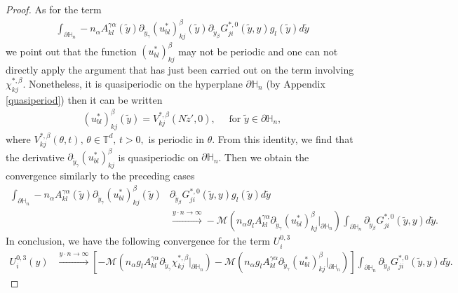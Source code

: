 \documentclass[11pt, reqno]{amsart}
\theoremstyle{definition}
\theoremstyle{remark}
\numberwithin{equation}{section}
\begin{document}
\begin{proof}[Proof]
		\noindent 	As for the term 
		\begin{align*}
			\int_{\partial\mathbb{H}_n}\!\!-n_\alpha A^{\gamma\alpha}_{kl}(\tilde{y})\partial_{ \tilde{y}_\gamma}  (u^*_{bl})^{\beta}_{kj}\left(\tilde{y} \right) \partial_{ \tilde{y}_\beta} G^{*,0}_{ji}\left(\tilde{y},y\right)  g_l(\tilde{y}) d\tilde{y}
		\end{align*}
		we point out that the function $(u^*_{bl})^{\beta}_{kj}$ may not be  periodic and one can not directly apply the argument that has just been carried out on the term involving $ \chi_{kj}^{*,\beta}$. Nonetheless, it is quasiperiodic on the hyperplane  $\partial\mathbb{H}_n$ (by Appendix \ref{quasiperiod}) then it can be written 
		\begin{align}
			(u^*_{bl})^{\beta}_{kj}(\tilde{y})=  V_{kj}^{*,\beta}( N\tilde{z}',0 ),\quad \mbox{ for }\tilde{y}\in\partial\mathbb{H}_n,	\label{id_quasiperiod_u}
		\end{align}
		where $V_{kj}^{*,\beta}(\theta,t),\, \theta\in \mathbb{T}^d, \, t>0,$ is periodic in $\theta$.
		From this identity, we find that the derivative $\partial_{ \tilde{y}_\gamma} (u^*_{bl})^{\beta}_{kj}$ is quasiperiodic on $\partial\mathbb{H}_n$.	Then we obtain the convergence similarly to the preceding cases
		\begin{align*}
			\int_{\partial\mathbb{H}_n} -n_\alpha A^{\gamma\alpha}_{kl}(\tilde{y})\partial_{ \tilde{y}_\gamma}  (u^*_{bl})^{\beta}_{kj}(\tilde{y})&\partial_{\tilde{y}_\beta} G^{*,0}_{ji}(\tilde{y},y) g_l(\tilde{y}) d\tilde{y} \\
			& \xrightarrow{y\cdot n\rightarrow \infty}-\mathcal{M}(n_\alpha g_l A^{\gamma\alpha}_{kl}\partial_{ \tilde{y}_\gamma}  (u^*_{bl})^{\beta}_{kj}|_{\partial\mathbb{H}_n})
			\int_{\partial\mathbb{H}_n} \!\partial_{ \tilde{y}_\beta}G^{*,0}_{ji}(\tilde{y},y) d\tilde{y} .
		\end{align*}
		In conclusion, we have the following convergence for the term $U_i^{0,3}$
		\begin{align}
			U_i^{0,3}(y)
			& \xrightarrow{y\cdot n\rightarrow \infty}\left[-\mathcal{M}(n_\alpha g_l A^{\gamma\alpha}_{kl}\partial_{ \tilde{y}_\gamma}  \chi_{kj}^{*,\beta}|_{\partial\mathbb{H}_n})-\mathcal{M}(n_\alpha g_l A^{\gamma\alpha}_{kl}\partial_{ \tilde{y}_\gamma}  (u^*_{bl})^{\beta}_{kj}|_{\partial\mathbb{H}_n}) \right]\!
			\int_{\partial\mathbb{H}_n}\!\! \partial_{\tilde{y}_\beta}G^{*,0}_{ji}(\tilde{y},y) d\tilde{y} \label{convbl3}.
		\end{align}	
		

\end{proof}
\end{document}
